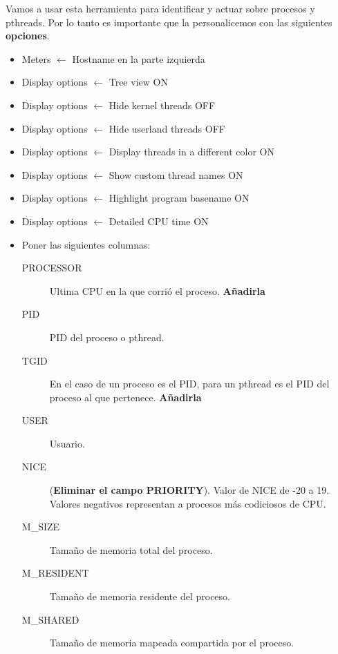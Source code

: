 \documentclass[a4paper,11pt,spanish,twoside]{article}
\begin{document}
Vamos a usar esta herramienta para identificar y actuar sobre procesos
y pthreads.  Por lo tanto es importante que la personalicemos con las
siguientes \textbf{opciones}.

  \begin{itemize}
  \item Meters $\leftarrow$ Hostname en la parte izquierda

  \item Display options $\leftarrow$ Tree view ON
  \item Display options $\leftarrow$ Hide kernel threads OFF
  \item Display options $\leftarrow$ Hide userland threads OFF
  \item Display options $\leftarrow$ Display threads in a different
    color ON
  \item Display options $\leftarrow$ Show custom thread names ON
  \item Display options $\leftarrow$ Highlight program basename ON
  \item Display options $\leftarrow$ Detailed CPU time ON


  \item Poner las siguientes columnas:

    \begin{description}
    \item[PROCESSOR] Ultima CPU en la que corrió el proceso.  \textbf{Añadirla}

    \item[PID] PID del proceso o pthread.

    \item[TGID] En el caso de un proceso es el PID, para un pthread es
      el PID del proceso al que pertenece. \textbf{Añadirla}

    \item[USER] Usuario.

    \item[NICE] (\textbf{Eliminar el campo PRIORITY}).  Valor de NICE de -20 a
      19.  Valores negativos representan a procesos más codiciosos de CPU.


    \item[M\_SIZE] Tamaño de memoria total del proceso.


    \item[M\_RESIDENT] Tamaño de memoria residente del proceso.


    \item[M\_SHARED] Tamaño de memoria mapeada compartida por el
      proceso.



\end{description}
\end{itemize}
\end{document}
